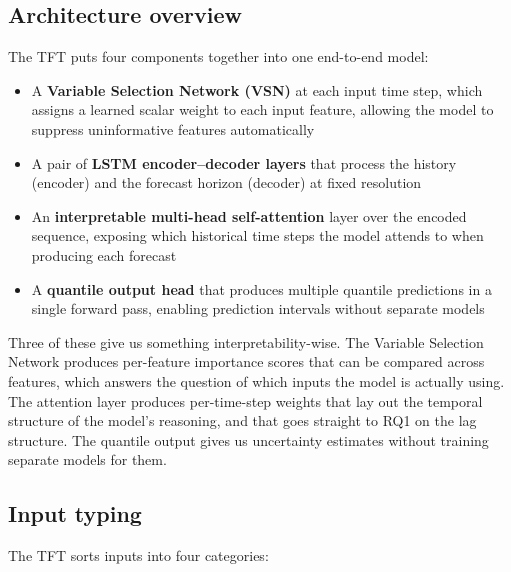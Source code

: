 \subsection{Architecture overview}\label{sec:tft-architecture}

The TFT puts four components together into one end-to-end model:

\begin{itemize}
  \item A \textbf{Variable Selection Network (VSN)} at each input time step, which assigns a learned scalar weight to each input feature, allowing the model to suppress uninformative features automatically
  \item A pair of \textbf{LSTM encoder--decoder layers} that process the history (encoder) and the forecast horizon (decoder) at fixed resolution
  \item An \textbf{interpretable multi-head self-attention} layer over the encoded sequence, exposing which historical time steps the model attends to when producing each forecast
  \item A \textbf{quantile output head} that produces multiple quantile predictions in a single forward pass, enabling prediction intervals without separate models
\end{itemize}

Three of these give us something interpretability-wise. The Variable Selection Network produces per-feature importance scores that can be compared across features, which answers the question of which inputs the model is actually using. The attention layer produces per-time-step weights that lay out the temporal structure of the model's reasoning, and that goes straight to RQ1 on the lag structure. The quantile output gives us uncertainty estimates without training separate models for them.

\subsection{Input typing}\label{sec:input-typing}

The TFT sorts inputs into four categories:

